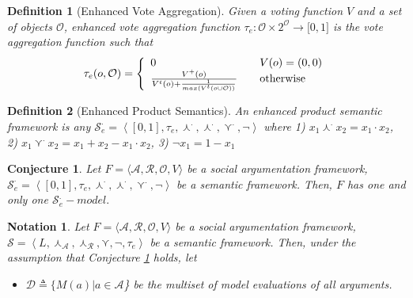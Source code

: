 \documentclass{article}
\newtheorem{definition}{Definition}
\newtheorem{property}{Property}
\newtheorem{conjecture}{Conjecture}
\newtheorem{notation}{Notation}
\newcommand{\args}{\mathcal{A}} %
\newcommand{\att}{\mathcal{R}}  %
\newcommand{\valueset}{L}
\newcommand{\obj}{\mathcal{O}} %
\newcommand{\safid}{F}               %
\newcommand{\safbodyO}{\langle \args, \att, \obj, V \rangle} %
\newcommand{\safO}{\safid = \safbodyO} %
\newcommand{\semid}{\mathcal{S}}        %
\newcommand{\sembodyNewE}{\left\langle \valueset,\SAFand_\mathcal{A}, \SAFand_\mathcal{R},\SAFor,\lnot,\tau_{e} \right\rangle} %
\newcommand{\SAFand}{\curlywedge}     %
\newcommand{\SAFor}{\curlyvee}        %
\newcommand{\sem}{\mathcal{S}}
\newcommand{\dataset}{\mathcal{D}}   %
\begin{document}
\begin{definition}[Enhanced Vote Aggregation]
\label{def:enhVoteAgg}
Given a voting function $V$ and a set of objects $\obj$, enhanced vote aggregation function
$\tau_{e}:\obj  \times {2}^{\obj} \rightarrow\lbrack0,1]$ is the vote aggregation function such that
\[
\tau_{e}  (o, \mathcal{O})  = \left\{
\begin{array}
[c]{lll}
0 &  & V(o) = (0,0)\\
\frac{V^{+}(o)}{V^{t}(o)+\frac{1}{max(V^{t}(o \cup \mathcal{O}))}} &  & \text{otherwise}%
\end{array}
\right.
\]
\end{definition}

\begin{definition}
[Enhanced Product Semantics]An enhanced product semantic framework is any
$\mathcal{S}_{e}^{\cdot}=\left\langle [0,1],\tau_{e
},\curlywedge^{\cdot}, \curlywedge^{\cdot}, \curlyvee^{\cdot},\lnot\right\rangle $ where 1) $x_{1}\curlywedge^{\cdot}
x_{2}=x_{1}\cdot x_{2}$, 2) $x_{1}\curlyvee^{\cdot} x_{2}=x_{1}+x_{2}-x_{1}\cdot
x_{2}$, 3) $\lnot x_{1}=1-x_{1}$
\end{definition}

\begin{conjecture}
\label{conj:1model}
Let $\safO$ be a social argumentation framework, $\mathcal{S}_{e}^{\cdot}=\left\langle [0,1],\tau_{e
},\curlywedge^{\cdot}, \curlywedge^{\cdot}, \curlyvee^{\cdot},\lnot\right\rangle$ be a semantic framework. Then, $\safid$ has one and only one $\semid_{e}^{.}-model.$

\end{conjecture}

\begin{notation}
Let $\safO$ be a social argumentation framework, $\sem = \sembodyNewE$ be a semantic framework. Then, under the assumption that Conjecture \ref{conj:1model} holds, let 
\begin{itemize}
\item $\dataset \triangleq \{M(a)|a \in \args$\} be the multiset of model evaluations of all arguments.
\end{itemize}
\end{notation}





\begin{comment}
\begin{property}
\label{P1} [Absolute argument freeness] \\
Let $\tau$ be a a vote aggregation function given a set of values $\valueset$, a set of objects $\obj$ and a value function $V$. We say that $\tau$ is 'absolute argument free' if
\begin{center}
$\forall o \in \obj$, $\tau (o, \obj) \neq \top$.
\end{center}
\end{property}
\end{comment}
\end{document}
